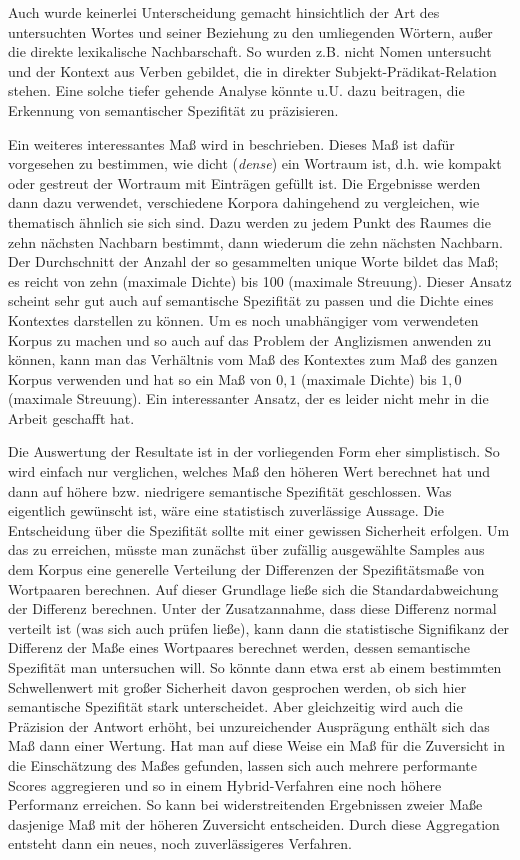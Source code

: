 \documentclass[11pt,numbers=noenddot]{scrartcl}
\begin{document}
Auch wurde keinerlei Unterscheidung gemacht hinsichtlich der Art des untersuchten Wortes und seiner Beziehung zu den umliegenden Wörtern, außer die direkte lexikalische Nachbarschaft. So wurden z.B. nicht Nomen untersucht und der Kontext aus Verben gebildet, die in direkter Subjekt-Prädikat-Relation stehen. Eine solche tiefer gehende Analyse könnte u.U. dazu beitragen, die Erkennung von semantischer Spezifität zu präzisieren.

Ein weiteres interessantes Maß wird in \citet{Sahlgren2005} beschrieben. Dieses Maß ist dafür vorgesehen zu bestimmen, wie dicht (\emph{dense}) ein Wortraum ist, d.h. wie kompakt oder gestreut der Wortraum mit Einträgen gefüllt ist. Die Ergebnisse werden dann dazu verwendet, verschiedene Korpora dahingehend zu vergleichen, wie thematisch ähnlich sie sich sind. Dazu werden zu jedem Punkt des Raumes die zehn nächsten Nachbarn bestimmt, dann wiederum die zehn nächsten Nachbarn. Der Durchschnitt der Anzahl der so gesammelten unique Worte bildet das Maß; es reicht von zehn (maximale Dichte) bis 100 (maximale Streuung). Dieser Ansatz scheint sehr gut auch auf semantische Spezifität zu passen und die Dichte eines Kontextes darstellen zu können. Um es noch unabhängiger vom verwendeten Korpus zu machen und so auch auf das Problem der Anglizismen anwenden zu können, kann man das Verhältnis vom Maß des Kontextes zum Maß des ganzen Korpus verwenden und hat so ein Maß von $0,1$ (maximale Dichte) bis $1,0$ (maximale Streuung). Ein interessanter Ansatz, der es leider nicht mehr in die Arbeit geschafft hat.

Die Auswertung der Resultate ist in der vorliegenden Form eher simplistisch. So wird einfach nur verglichen, welches Maß den höheren Wert berechnet hat und dann auf höhere bzw. niedrigere semantische Spezifität geschlossen. Was eigentlich gewünscht ist, wäre eine statistisch zuverlässige Aussage. Die Entscheidung über die Spezifität sollte mit einer gewissen Sicherheit erfolgen. Um das zu erreichen, müsste man zunächst über zufällig ausgewählte Samples aus dem Korpus eine generelle Verteilung der Differenzen der Spezifitätsmaße von Wortpaaren berechnen. Auf dieser Grundlage ließe sich die Standardabweichung der Differenz berechnen. Unter der Zusatzannahme, dass diese Differenz normal verteilt ist (was sich auch prüfen ließe), kann dann die statistische Signifikanz der Differenz der Maße eines Wortpaares berechnet werden, dessen semantische Spezifität man untersuchen will. So könnte dann etwa erst ab einem bestimmten Schwellenwert mit großer Sicherheit davon gesprochen werden, ob sich hier semantische Spezifität stark unterscheidet. Aber gleichzeitig wird auch die Präzision der Antwort erhöht, bei unzureichender Ausprägung enthält sich das Maß dann einer Wertung. Hat man auf diese Weise ein Maß für die Zuversicht in die Einschätzung des Maßes gefunden, lassen sich auch mehrere performante Scores aggregieren und so in einem Hybrid-Verfahren eine noch höhere Performanz erreichen. So kann bei widerstreitenden Ergebnissen zweier Maße dasjenige Maß mit der höheren Zuversicht entscheiden. Durch diese Aggregation entsteht dann ein neues, noch zuverlässigeres Verfahren.
\end{document}
